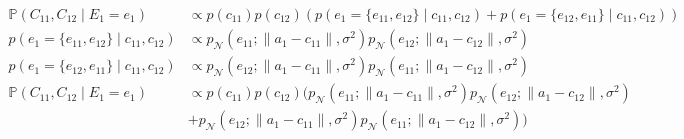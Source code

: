 \documentclass[10pt]{article}
\begin{document}
\begin{enumerate}[label=(\alph*)]
	\begin{align*}
	\mathbb{P}(C_{11}, C_{12} \mid E_1 = e_1) &\propto p(c_{11}) p(c_{12}) (p(e_1 = \{ e_{11}, e_{12} \} \mid c_{11}, c_{12}) + p(e_1 = \{ e_{12}, e_{11} \} \mid c_{11}, c_{12}))\\
	p(e_1 = \{ e_{11}, e_{12} \} \mid c_{11}, c_{12}) &\propto p_{\mathcal{N}}(e_{11}; \lVert a_1 - c_{11} \rVert, \sigma^2) p_{\mathcal{N}}(e_{12}; \lVert a_1 - c_{12} \rVert, \sigma^2)\\
	p(e_1 = \{ e_{12}, e_{11} \} \mid c_{11}, c_{12}) &\propto p_{\mathcal{N}}(e_{12}; \lVert a_1 - c_{11} \rVert, \sigma^2) p_{\mathcal{N}}(e_{11}; \lVert a_1 - c_{12} \rVert, \sigma^2)\\
	\mathbb{P}(C_{11}, C_{12} \mid E_1 = e_1) &\propto p(c_{11}) p(c_{12}) (p_{\mathcal{N}}(e_{11}; \lVert a_1 - c_{11} \rVert, \sigma^2) p_{\mathcal{N}}(e_{12}; \lVert a_1 - c_{12} \rVert, \sigma^2)\\
	&+ p_{\mathcal{N}}(e_{12}; \lVert a_1 - c_{11} \rVert, \sigma^2) p_{\mathcal{N}}(e_{11}; \lVert a_1 - c_{12} \rVert, \sigma^2))
	\end{align*}
  \iffalse
  \item Assuming the prior $p(c_{1i})$ is the same for all $i$, show that the number of assignments for all $K$ cars $(c_{11}, \dots, c_{1K})$ that obtain the maximum value of $\mathbb{P}(C_{11} = c_{11}, \dots, C_{1K} = c_{1K} \mid E_1 = e_1)$ is at least $K!$.
  
  \item For general $K$, what is the treewidth corresponding to the posterior distribution over all $K$ car locations at all $T$ time steps conditioned on all the sensor readings:
  $$\mathbb{P}(C_{11} = c_{11}, \dots, C_{1K} = c_{1K} , \dots, C_{T1} = c_{T1}, \dots, C_{TK} = c_{TK} \mid E_1 = e_1, \dots, E_T = e_T)$$
  
  \item \textbf{[Extra Credit]} Now suppose you change your sensors so that at each time step $t$, they return the list of exact positions of the $K$ cars, but shifted (with wrap around) by a random amount. For example, if the true car positions at time step 1 are $c_{11}=1$, $c_{12}=3$, $c_{13}=8$, $c_{14}=5$, then $e_1$ would be $[1,3,8,5]$, $[3,8,5,1]$, $[8,5,1,3]$, or $[5,1,3,8]$, each with probability $\frac{1}{4}$. Describe an efficient algorithm for computing $p(c_{ti} \mid e_1, \dots, e_T)$ for any time step $t$ and car $i$. Your algorithm should not be exponential in $K$ or $T$.
	\fi	
\end{enumerate}
\end{document}
